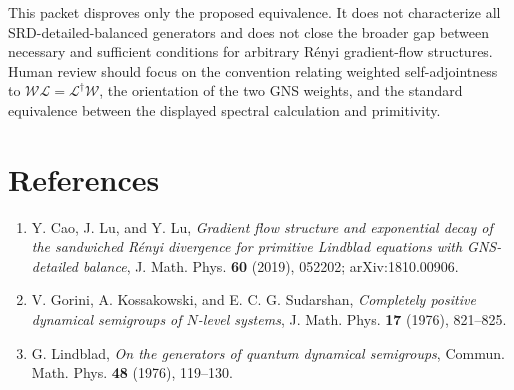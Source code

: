 \documentclass[10pt]{article}
\newcommand{\cL}{\mathcal L}
\newcommand{\W}{\mathcal W}
\begin{document}
This packet disproves only the proposed equivalence.  It does not characterize
all SRD-detailed-balanced generators and does not close the broader gap between
necessary and sufficient conditions for arbitrary R\'enyi gradient-flow
structures.  Human review should focus on the convention relating weighted
self-adjointness to $\W\cL=\cL^\dagger\W$, the orientation of the two GNS
weights, and the standard equivalence between the displayed spectral
calculation and primitivity.

\section*{References}

\begin{enumerate}
\item Y. Cao, J. Lu, and Y. Lu, \emph{Gradient flow structure and exponential
decay of the sandwiched R\'enyi divergence for primitive Lindblad equations
with GNS-detailed balance}, J. Math. Phys. \textbf{60} (2019), 052202;
arXiv:1810.00906.
\item V. Gorini, A. Kossakowski, and E. C. G. Sudarshan,
\emph{Completely positive dynamical semigroups of $N$-level systems},
J. Math. Phys. \textbf{17} (1976), 821--825.
\item G. Lindblad, \emph{On the generators of quantum dynamical semigroups},
Commun. Math. Phys. \textbf{48} (1976), 119--130.
\end{enumerate}
\end{document}
